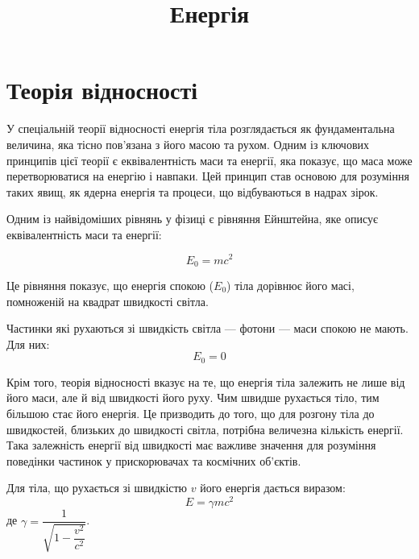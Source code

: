 \documentclass[a4paper]{article}
\title{Енергія}
\author{}
\date{}
\begin{document}
\maketitle

\section{Теорія відносності}

У спеціальній теорії відносності енергія тіла розглядається як фундаментальна величина, яка тісно
пов'язана з його масою та рухом. Одним із ключових принципів цієї теорії є еквівалентність маси та
енергії, яка показує, що маса може перетворюватися на енергію і навпаки. Цей принцип став основою для
розуміння таких явищ, як ядерна енергія та процеси, що відбуваються в надрах зірок.

\begin{Example}\label{ex:einstein}
	Одним із найвідоміших рівнянь у фізиці є рівняння Ейнштейна, яке описує еквівалентність маси та
	енергії:

	\begin{equation}\label{eq:einstein}
		E_0 = mc^2
	\end{equation}

	Це рівняння показує, що енергія спокою ($E_0$) тіла дорівнює його масі, помноженій на квадрат
	швидкості світла.

    Частинки які рухаються зі швидкість світла --- фотони --- маси спокою не мають. Для них:
    \begin{equation}
        E_0 = 0
    \end{equation}

\end{Example}

Крім того, теорія відносності вказує на те, що енергія тіла залежить не лише від його маси, але й від
швидкості його руху. Чим швидше рухається тіло, тим більшою стає його енергія. Це призводить до того,
що для розгону тіла до швидкостей, близьких до швидкості світла, потрібна величезна кількість
енергії. Така залежність енергії від швидкості має важливе значення для розуміння поведінки частинок
у прискорювачах та космічних об'єктів.



\begin{Example}\label{ex:einstein2}
	Для тіла, що рухається зі швидкістю $v$ його енергія дається виразом:
	\begin{equation}\label{eq:einstein2}
		E = \gamma mc^2
	\end{equation}
де $\gamma = \dfrac1{\sqrt{1-\dfrac{v^2}{c^2}}}$.
\end{Example}
\end{document}
